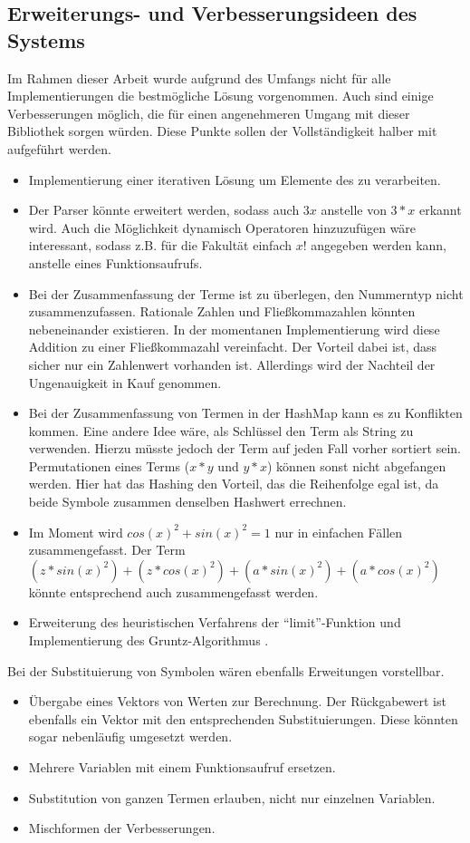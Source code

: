 \documentclass[11pt,a4paper, ngerman]{article}
\begin{document}
\subsection{Erweiterungs- und Verbesserungsideen des Systems}
Im Rahmen dieser Arbeit wurde aufgrund des Umfangs nicht für alle Implementierungen die bestmögliche Lösung vorgenommen. Auch sind einige Verbesserungen möglich, die für einen angenehmeren Umgang mit dieser Bibliothek sorgen würden. Diese Punkte sollen der Vollständigkeit halber mit aufgeführt werden.
\begin{itemize}
    \item Implementierung einer iterativen Lösung um Elemente des  zu verarbeiten.
    \item Der Parser könnte erweitert werden, sodass auch $3x$ anstelle von $3*x$ erkannt wird. Auch die Möglichkeit dynamisch Operatoren hinzuzufügen wäre interessant, sodass z.B. für die Fakultät einfach $x!$ angegeben werden kann, anstelle eines Funktionsaufrufs.
    \item Bei der Zusammenfassung der Terme ist zu überlegen, den Nummerntyp nicht zusammenzufassen. Rationale Zahlen und Fließkommazahlen könnten nebeneinander existieren. In der momentanen Implementierung wird diese Addition zu einer Fließkommazahl vereinfacht. Der Vorteil dabei ist, dass sicher nur ein Zahlenwert vorhanden ist. Allerdings wird der Nachteil der Ungenauigkeit in Kauf genommen.
    \item Bei der Zusammenfassung von Termen in der HashMap kann es zu Konflikten kommen. Eine andere Idee wäre, als Schlüssel den Term als String zu verwenden. Hierzu müsste jedoch der Term auf jeden Fall vorher sortiert sein. Permutationen eines Terms ($x*y$ und $y*x$) können sonst nicht abgefangen werden. Hier hat das Hashing den Vorteil, das die Reihenfolge egal ist, da beide Symbole zusammen denselben Hashwert errechnen.
    \item Im Moment wird $cos(x)^2+sin(x)^2 = 1$ nur in einfachen Fällen zusammengefasst. Der Term $(z*sin(x)^2)+(z*cos(x)^2) + (a*sin(x)^2)+(a*cos(x)^2)$ könnte entsprechend auch zusammengefasst werden.
    \item Erweiterung des heuristischen Verfahrens der ``limit''-Funktion und Implementierung des Gruntz-Algorithmus \cite{GruntzPdf}.
\end{itemize}

Bei der Substituierung von Symbolen wären ebenfalls Erweitungen vorstellbar.
\begin{itemize}
    \item Übergabe eines Vektors von Werten zur Berechnung. Der Rückgabewert ist ebenfalls ein Vektor mit den entsprechenden Substituierungen. Diese könnten sogar nebenläufig umgesetzt werden.
    \item Mehrere Variablen mit einem Funktionsaufruf ersetzen.
    \item Substitution von ganzen Termen erlauben, nicht nur einzelnen Variablen.
    \item Mischformen der Verbesserungen.
\end{itemize}
\end{document}
